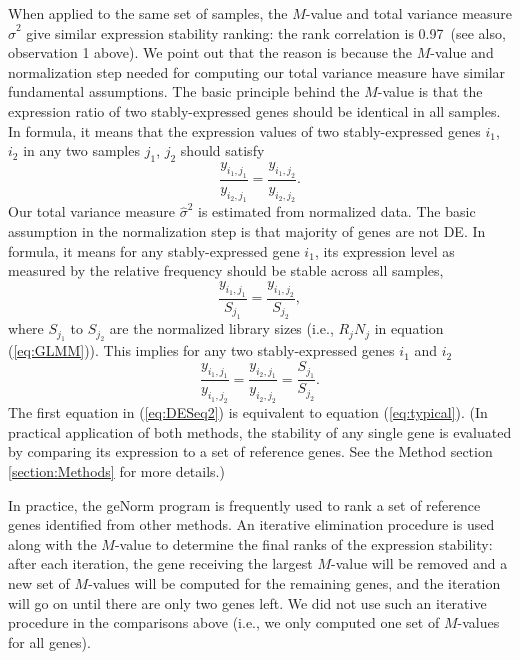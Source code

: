 \documentclass[letterpaper,12pt]{article}
\newcommand{\recallrankcorrelation}{0.97~}
\begin{document}
When applied to the same set of samples, the $M$-value and total variance
measure $\hat\sigma^2$ give similar expression stability ranking: the rank
correlation is \recallrankcorrelation (see also, observation 1 above).
We point out that the reason is because the $M$-value and normalization step
needed for computing our total variance measure have similar fundamental
assumptions. 
The basic principle
behind the $M$-value is that the expression ratio of two stably-expressed
genes should be identical in all samples. In formula, it means that the
expression values of two stably-expressed genes $i_1$, $i_2$ in any two samples $j_1$, $j_2$
should satisfy
\begin{equation}\label{eq:typical}
   \dfrac{y_{i_1, j_1}}{y_{i_2, j_1}} = \dfrac{y_{i_1, j_2}}{y_{i_2, j_2}}.
\end{equation} 
Our total variance measure $\hat\sigma^2$ is estimated from normalized data.
The basic assumption in the normalization step is that majority of genes are
not DE. In formula, it means for any stably-expressed gene $i_1$, its expression
level as measured by the relative frequency should be stable across all
samples,
\begin{equation}\label{eq:DESeq} 
    \frac{y_{i_1, j_1}}{S_{j_1}}= \dfrac{y_{i_1, j_2}}{S_{j_2}},
\end{equation}
where $S_{j_1}$ to $S_{j_2}$ are the normalized library sizes (i.e., $R_j N_j$ in equation (\ref{eq:GLMM})).
This implies for any two stably-expressed genes $i_1$ and $i_2$
\begin{equation}\label{eq:DESeq2} 
    \frac{y_{i_1, j_1}}{y_{i_1, j_2}} = \frac{y_{i_2, j_1}}{y_{i_2, j_2}} =
    \frac{S_{j_1}}{S_{j_2}}.
\end{equation}
The first equation in (\ref{eq:DESeq2}) is equivalent to equation
(\ref{eq:typical}). (In practical application of both methods, the stability
of any single gene is evaluated by comparing its expression to a set of
reference genes. See the Method section \ref{section:Methods} for more details.)

In practice, the geNorm program \citep{vandesompele2002accurate} is frequently
used to rank a set of reference genes identified from other methods.  An
iterative elimination procedure is used along with the $M$-value to determine
the final ranks of the expression stability:  after each iteration, the gene
receiving the largest $M$-value will be removed and a new set of $M$-values
will be computed for the remaining genes, and the iteration will go on until
there are only two genes left.  We did not use such an iterative procedure in
the comparisons above (i.e., we only computed one set of $M$-values for all
genes). 
\end{document}

